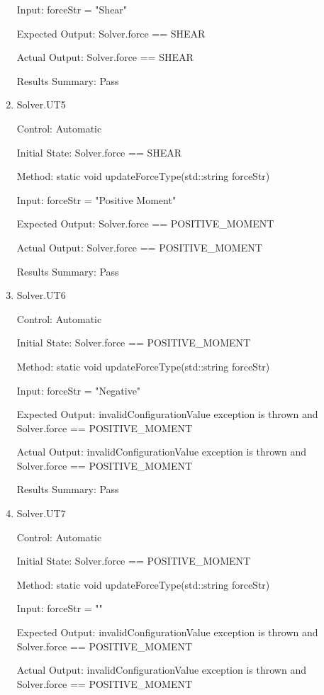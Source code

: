 \documentclass[12pt, titlepage]{article}
\begin{document}
\begin{enumerate}
    Input: forceStr = "Shear"
    
    Expected Output: Solver.force == SHEAR

    Actual Output: Solver.force == SHEAR

    Results Summary: Pass

    \item{Solver.UT5\\}
    
    Control: Automatic

    Initial State: Solver.force == SHEAR
    
    Method: static void updateForceType(std::string forceStr)
    
    Input: forceStr = "Positive Moment"
    
    Expected Output: Solver.force == POSITIVE\_MOMENT

    Actual Output: Solver.force == POSITIVE\_MOMENT

    Results Summary: Pass

    \item{Solver.UT6\\}
    
    Control: Automatic

    Initial State: Solver.force == POSITIVE\_MOMENT
    
    Method: static void updateForceType(std::string forceStr)
    
    Input: forceStr = "Negative"
    
    Expected Output: invalidConfigurationValue exception is thrown and Solver.force == POSITIVE\_MOMENT

    Actual Output: invalidConfigurationValue exception is thrown and Solver.force == POSITIVE\_MOMENT

    Results Summary: Pass

    \item{Solver.UT7\\}
    
    Control: Automatic

    Initial State: Solver.force == POSITIVE\_MOMENT
    
    Method: static void updateForceType(std::string forceStr)
    
    Input: forceStr = ""
    
    Expected Output: invalidConfigurationValue exception is thrown and Solver.force == POSITIVE\_MOMENT

    Actual Output: invalidConfigurationValue exception is thrown and Solver.force == POSITIVE\_MOMENT


\end{enumerate}
\end{document}
